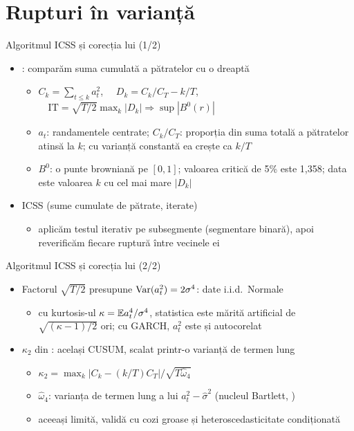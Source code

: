 \section{Rupturi în varianță}

\begin{frame}{Algoritmul ICSS și corecția lui (1/2)}
\itemsize{\small}
\begin{itemize}
    \item {}: comparăm suma cumulată a pătratelor cu o dreaptă
    \begin{itemize}
        \item $C_k = \sum_{t \le k} a_t^2$, $\quad D_k = C_k/C_T - k/T$, $\quad \mathrm{IT} = \sqrt{T/2}\max_k|D_k| \Rightarrow \sup|B^0(r)|$
        \item $a_t$: randamentele centrate; $C_k/C_T$: proporția din suma totală a pătratelor atinsă la $k$; cu varianță constantă ea crește ca $k/T$
        \item $B^0$: o punte browniană pe $[0,1]$; valoarea critică de 5\% este 1,358; data este valoarea $k$ cu cel mai mare $|D_k|$
    \end{itemize}
    \item ICSS (sume cumulate de pătrate, iterate)
    \begin{itemize}
        \item aplicăm testul iterativ pe subsegmente (segmentare binară), apoi reverificăm fiecare ruptură între vecinele ei
    \end{itemize}
\end{itemize}
\end{frame}

\begin{frame}{Algoritmul ICSS și corecția lui (2/2)}
\itemsize{\small}
\begin{itemize}
    \item Factorul $\sqrt{T/2}$ presupune $\text{Var}(a_t^2) = 2\sigma^4$: date i.i.d.\ Normale
    \begin{itemize}
        \item cu kurtosis-ul $\kappa = \mathbb{E} a_t^4/\sigma^4$, statistica este mărită artificial de $\sqrt{(\kappa - 1)/2}$ ori; cu GARCH, $a_t^2$ este și autocorelat
    \end{itemize}
    \item $\kappa_2$ din : același CUSUM, scalat printr-o varianță de termen lung
    \begin{itemize}
        \item $\kappa_2 = \max_k|C_k - (k/T)C_T|/\sqrt{T\hat\omega_4}$
        \item $\hat\omega_4$: varianța de termen lung a lui $a_t^2 - \hat\sigma^2$ (nucleul Bartlett, )
        \item aceeași limită, validă cu cozi groase și heteroscedasticitate condiționată
    \end{itemize}
\end{itemize}
\end{frame}

